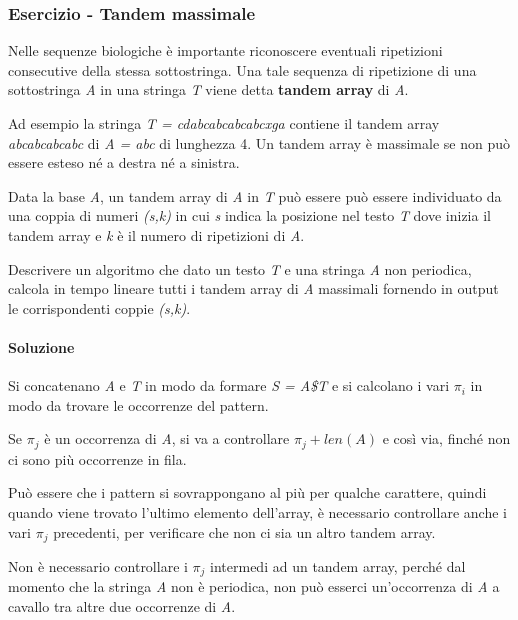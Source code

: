 \subsubsection{Esercizio - Tandem massimale}\label{esercizio---tandem-massimale}

Nelle sequenze biologiche è importante riconoscere eventuali ripetizioni consecutive della stessa sottostringa.
Una tale sequenza di ripetizione di una sottostringa \textit{A} in una stringa \textit{T} viene detta \textbf{tandem array} di \textit{A}.

Ad esempio la stringa \textit{T = cdabcabcabcabcxga} contiene  il tandem array \textit{abcabcabcabc} di \textit{A = abc} di lunghezza 4.
Un tandem array è massimale se non può essere esteso né a destra né a sinistra.

Data la base \textit{A}, un tandem array di \textit{A} in \textit{T} può essere può essere individuato da una coppia di numeri \textit{(s,k)} in cui \textit{s} indica la posizione nel testo \textit{T} dove inizia il tandem array e \textit{k} è il numero di ripetizioni di \textit{A}.

Descrivere un algoritmo che dato un testo \textit{T} e una stringa \textit{A} non periodica, calcola in tempo lineare tutti i tandem array di \textit{A} massimali fornendo in output le corrispondenti coppie \textit{(s,k)}.



\paragraph{Soluzione}\label{soluzione}

Si concatenano \emph{A} e \emph{T} in modo da formare \emph{S = A\$T} e si calcolano i vari $\pi_i$ in modo da trovare le occorrenze del
pattern.

Se $\pi_j$ è un occorrenza di \emph{A}, si va a controllare
$\pi_j+len(A)$ e così via, finché non ci sono più occorrenze in
fila.

Può essere che i pattern si sovrappongano al più per qualche carattere,
quindi quando viene trovato l'ultimo elemento dell'array, è necessario
controllare anche i vari $\pi_j$ precedenti, per verificare che non ci sia un altro tandem array.

Non è necessario controllare i $\pi_j$ intermedi ad un tandem array,
perché dal momento che la stringa \emph{A} non è periodica, non può
esserci un'occorrenza di \emph{A} a cavallo tra altre due occorrenze di
\emph{A}.

